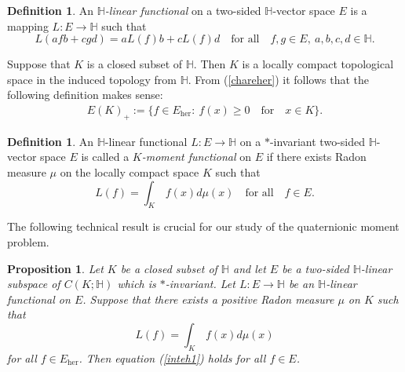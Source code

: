 \documentclass[11pt,a4paper]{amsart}
\newtheorem{proposition}[theorem]{Proposition}
\theoremstyle{definition}
\newtheorem{definition}[theorem]{Definition}
\begin{document}
\begin{definition}
\label{defn3.3}
An \emph{$\mathbb{H}$-linear functional} on a two-sided $\mathbb{H}$-vector
space $E$ is a mapping $L:E\to \mathbb{H}$ such that
%
\begin{equation*}
L(afb+cgd)=aL(f)b +cL(f)d\quad \text{for all} \quad f,g\in E,~ a,b,c,d
\in \mathbb{H}.
\end{equation*}
%
\end{definition}
%
Suppose that $K$ is a closed subset of $\mathbb{H}$. Then $K$ is a locally
compact topological space in the induced topology from $\mathbb{H}$. From
(\ref{chareher}) it follows that the following definition makes sense:%
%
\begin{align}
E(K)_{+}:=\{ f\in E_{\mathrm{her}}:~ f(x)\geq 0 \quad \text{for}
\quad x\in K\}.
\end{align}
%
\begin{definition}%
\label{quatmf}
An $\mathbb{H}$-linear functional $L:E\to \mathbb{H}$ on a $*$-invariant
two-sided $\mathbb{H}$-vector space $E$ is called a
\emph{$K$-moment functional} on $E$ if there exists Radon measure
$\mu $ on the locally compact space $K$ such that
%
\begin{equation}
L(f) = \int _{K}\, f(x) d\mu (x)\quad \text{for all}\quad f \in E.
\end{equation}
%
\end{definition}
%
The following technical result is crucial for our study of the quaternionic
moment problem.
%
\begin{proposition}%
\label{extensionherHH}
Let $K$ be a closed subset of $\mathbb{H}$ and let $E$ be a two-sided
$\mathbb{H}$-linear subspace of  $C(K;\mathbb{H})$ which is $*$-invariant.
Let $L:E\to \mathbb{H}$ be an $\mathbb{H}$-linear functional on $E$. Suppose
that there exists a positive Radon measure $\mu $ on $K$ such that
%
\begin{equation}
\label{inteh1}
L(f) = \int _{K}\, f(x) d\mu (x)
\end{equation}
%
for all $f \in E_{\mathrm{her}}$. Then equation (\ref{inteh1}) holds for
all $f\in E$.
\end{proposition}
%
\end{document}
